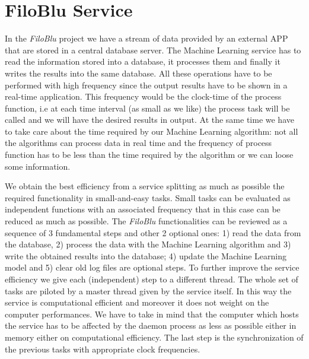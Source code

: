 \documentclass{standalone}
\begin{document}
\section*{FiloBlu Service}

In the \emph{FiloBlu} project we have a stream of data provided by an external APP that are stored in a central database server.
The Machine Learning service has to read the information stored into a database, it processes them and finally it writes the results into the same database.
All these operations have to be performed with high frequency since the output results have to be shown in a real-time application.
This frequency would be the clock-time of the process function, i.e at each time interval (as small as we like) the process task will be called and we will have the desired results in output.
At the same time we have to take care about the time required by our Machine Learning algorithm: not all the algorithms can process data in real time and the frequency of process function has to be less than the time required by the algorithm or we can loose some information.

We obtain the best efficiency from a service splitting as much as possible the required functionality in small-and-easy tasks.
Small tasks can be evaluated as independent functions with an associated frequency that in this case can be reduced as much as possible.
The \emph{FiloBlu} functionalities can be reviewed as a sequence of 3 fundamental steps and other 2 optional ones: 1) read the data from the database, 2) process the data with the Machine Learning algorithm and 3) write the obtained results into the database; 4) update the Machine Learning model and 5) clear old log files are optional steps.
To further improve the service efficiency we give each (independent) step to a different thread.
The whole set of tasks are piloted by a master thread given by the service itself.
In this way the service is computational efficient and moreover it does not weight on the computer performances.
We have to take in mind that the computer which hosts the service has to be affected by the daemon process as less as possible either in memory either on computational efficiency.
The last step is the synchronization of the previous tasks with appropriate clock frequencies.
\end{document}
